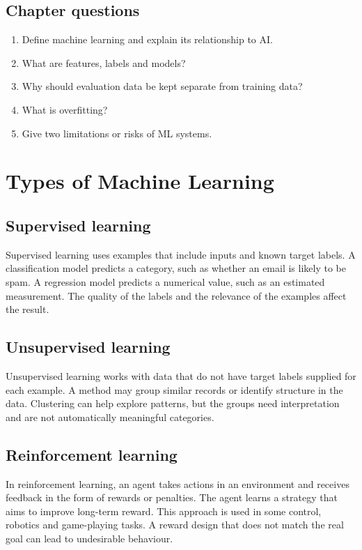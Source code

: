 \documentclass[11pt,openany,oneside]{book}
\begin{document}
\section{Chapter questions}
\begin{enumerate}
\item Define machine learning and explain its relationship to AI.
\item What are features, labels and models?
\item Why should evaluation data be kept separate from training data?
\item What is overfitting?
\item Give two limitations or risks of ML systems.
\end{enumerate}

\chapter{Types of Machine Learning}
\section{Supervised learning}
Supervised learning uses examples that include inputs and known target labels. A classification model predicts a category, such as whether an email is likely to be spam. A regression model predicts a numerical value, such as an estimated measurement. The quality of the labels and the relevance of the examples affect the result.

\section{Unsupervised learning}
Unsupervised learning works with data that do not have target labels supplied for each example. A method may group similar records or identify structure in the data. Clustering can help explore patterns, but the groups need interpretation and are not automatically meaningful categories.

\section{Reinforcement learning}
In reinforcement learning, an agent takes actions in an environment and receives feedback in the form of rewards or penalties. The agent learns a strategy that aims to improve long-term reward. This approach is used in some control, robotics and game-playing tasks. A reward design that does not match the real goal can lead to undesirable behaviour.
\end{document}
